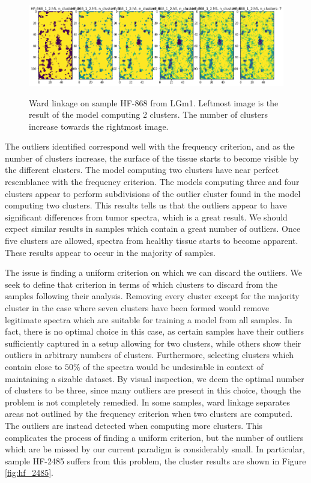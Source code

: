 \begin{figure}[H]

    \centering
{\includegraphics[width=15cm]{images/Ward_linkage/LGm-1/HF-868_1_2.h5_0.png} }
\caption{Ward linkage on sample HF-868 from LGm1. Leftmost image is the result of the model computing 2 clusters. The number of clusters increase towards the rightmost image.\label{fig:WL_HF868}}%

\end{figure}

The outliers identified correspond well with the frequency criterion, and as the number of clusters increase, the surface of the tissue starts to become visible by the different clusters. The model computing two clusters have near perfect resemblance with the frequency criterion. The models computing three and four clusters appear to perform subdivisions of the outlier cluster found in the model computing two clusters. This results tells us that the outliers appear to have significant differences from tumor spectra, which is a great result. We should expect similar results in samples which contain a great number of outliers. Once five clusters are allowed, spectra from healthy tissue starts to become apparent. These results appear to occur in the majority of samples.

The issue is finding a uniform criterion on which we can discard the outliers. We seek to define that criterion in terms of which clusters to discard from the samples following their analysis. Removing every cluster except for the majority cluster in the case where seven clusters have been formed would remove legitimate spectra which are suitable for training a model from all samples. In fact, there is no optimal choice in this case, as certain samples have their outliers sufficiently captured in a setup allowing for two clusters, while others show their outliers in arbitrary numbers of clusters. Furthermore, selecting clusters which contain close to $50\%$ of the spectra would be undesirable in context of maintaining a sizable dataset. By visual inspection, we deem the optimal number of clusters to be three, since many outliers are present in this choice, though the problem is not completely remedied. In some samples, ward linkage separates areas not outlined by the frequency criterion when two clusters are computed. The outliers are instead detected when computing more clusters. This complicates the process of finding a uniform criterion, but the number of outliers which are be missed by our current paradigm is considerably small. In particular, sample HF-2485 suffers from this problem, the cluster results are shown in Figure \ref{fig:hf_2485}.

